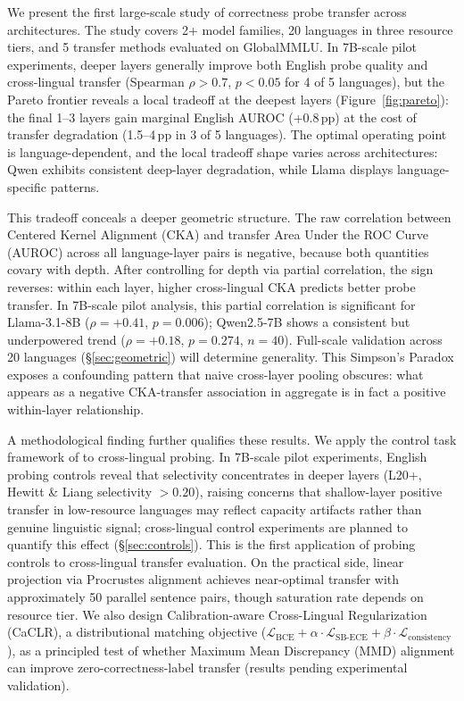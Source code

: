 We present the first large-scale study of correctness probe transfer across architectures. The study covers 2+ model families, 20 languages in three resource tiers, and 5 transfer methods evaluated on GlobalMMLU. In 7B-scale pilot experiments, deeper layers generally improve both English probe quality and cross-lingual transfer (Spearman $\rho > 0.7$, $p < 0.05$ for 4 of 5 languages), but the Pareto frontier reveals a local tradeoff at the deepest layers (Figure~\ref{fig:pareto}): the final 1--3 layers gain marginal English AUROC (+0.8\,pp) at the cost of transfer degradation (1.5--4\,pp in 3 of 5 languages). The optimal operating point is language-dependent, and the local tradeoff shape varies across architectures: Qwen exhibits consistent deep-layer degradation, while Llama displays language-specific patterns.

This tradeoff conceals a deeper geometric structure. The raw correlation between Centered Kernel Alignment (CKA) \cite{kornblith2019cka} and transfer Area Under the ROC Curve (AUROC) across all language-layer pairs is negative, because both quantities covary with depth. After controlling for depth via partial correlation, the sign reverses: within each layer, higher cross-lingual CKA predicts better probe transfer. In 7B-scale pilot analysis, this partial correlation is significant for Llama-3.1-8B ($\rho = +0.41$, $p = 0.006$); Qwen2.5-7B shows a consistent but underpowered trend ($\rho = +0.18$, $p = 0.274$, $n=40$). Full-scale validation across 20 languages (\S\ref{sec:geometric}) will determine generality. This Simpson's Paradox exposes a confounding pattern that naive cross-layer pooling obscures: what appears as a negative CKA-transfer association in aggregate is in fact a positive within-layer relationship.

A methodological finding further qualifies these results. We apply the control task framework of \citet{hewitt2019control} to cross-lingual probing. In 7B-scale pilot experiments, English probing controls reveal that selectivity concentrates in deeper layers (L20+, Hewitt \& Liang selectivity $> 0.20$), raising concerns that shallow-layer positive transfer in low-resource languages may reflect capacity artifacts rather than genuine linguistic signal; cross-lingual control experiments are planned to quantify this effect (\S\ref{sec:controls}). This is the first application of probing controls to cross-lingual transfer evaluation. On the practical side, linear projection via Procrustes alignment achieves near-optimal transfer with approximately 50 parallel sentence pairs, though saturation rate depends on resource tier. We also design Calibration-aware Cross-Lingual Regularization (CaCLR), a distributional matching objective ($\mathcal{L}_{\text{BCE}} + \alpha \cdot \mathcal{L}_{\text{SB-ECE}} + \beta \cdot \mathcal{L}_{\text{consistency}}$), as a principled test of whether Maximum Mean Discrepancy (MMD) alignment can improve zero-correctness-label transfer (results pending experimental validation).

